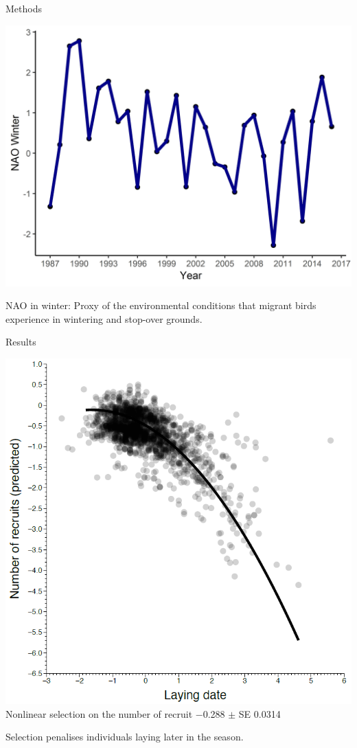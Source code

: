 \documentclass[compress]{beamer}
\begin{document}
\begin{frame}{Methods}
{ \centering\includegraphics[height = 5 cm]{Chapter/NAOw variation.jpg}\\
\raggedright
NAO in winter: Proxy of the environmental conditions that migrant birds experience in wintering and stop-over grounds.
 }
 
  

\end{frame}


\begin{frame}{Results}

 \centering
 \includegraphics[height = 6.5 cm]{Chapter/recruit.PNG}  \\
\small Nonlinear selection on the number of recruit −0.288 $\pm$ SE 0.0314 \\
  \vspace{0.5cm}
 \normalsize\raggedright Selection penalises individuals laying later in the season.\\

\end{frame}
\end{document}

